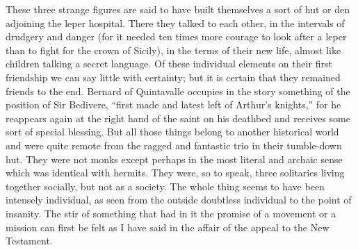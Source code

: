 \documentclass{book}
\begin{document}
These three strange figures are said to have built themselves a sort of hut or den adjoining the leper hospital. There they talked to each other, in the intervals of drudgery and danger (for it needed ten times more courage to look after a leper than to fight for the crown of Sicily), in the terms of their new life, almost like children talking a secret language. Of these individual elements on their first friendship we can say little with certainty; but it is certain that they remained friends to the end. Bernard of Quintavalle occupies in the story something of the position of Sir Bedivere, “first made and latest left of Arthur’s knights,” for he reappears again at the right hand of the saint on his deathbed and receives some sort of special blessing. But all those things belong to another historical world and were quite remote from the ragged and fantastic trio in their tumble-down hut. They were not monks except perhaps in the most literal and archaic sense which was identical with hermits. They were, so to speak, three solitaries living together socially, but not as a society. The whole thing seems to have been intensely individual, as seen from the outside doubtless individual to the point of insanity. The stir of something that had in it the promise of a movement or a mission can first be felt as I have said in the affair of the appeal to the New Testament.
\end{document}
